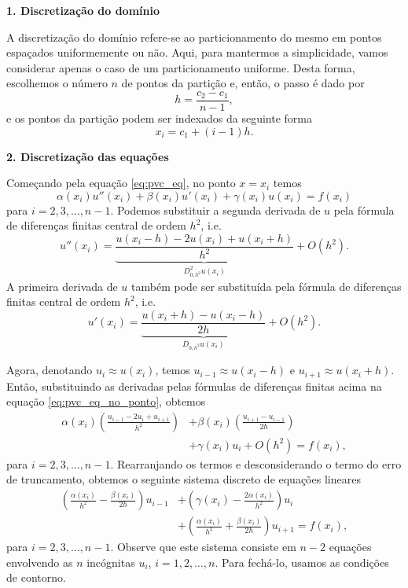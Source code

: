 \begin{flushleft}
  {\bf 1. Discretização do domínio}
\end{flushleft}

A discretização do domínio refere-se ao particionamento do mesmo em pontos espaçados uniformemente ou não. Aqui, para mantermos a simplicidade, vamos considerar apenas o caso de um particionamento uniforme. Desta forma, escolhemos o número $n$ de pontos da partição e, então, o passo é dado por
\begin{equation}
  h = \frac{c_2-c_1}{n-1},
\end{equation}
e os pontos da partição podem ser indexados da seguinte forma
\begin{equation}
  x_i = c_1 + (i-1)h.
\end{equation}

\begin{flushleft}
  {\bf 2. Discretização das equações}
\end{flushleft}

Começando pela equação \eqref{eq:pvc_eq}, no ponto $x=x_i$ temos
\begin{equation}
  \alpha(x_i) u''(x_i) + \beta(x_i) u'(x_i) + \gamma(x_i) u(x_i) = f(x_i) \label{eq:pvc_eq_no_ponto}
\end{equation}
para $i=2, 3, \dotsc, n-1$. Podemos substituir a segunda derivada de $u$ pela fórmula de diferenças finitas central de ordem $h^2$, i.e.
\begin{equation}
  u''(x_i) = \underbrace{\frac{u(x_i-h) - 2u(x_i) + u(x_i+h)}{h^2}}_{D_{0,h^2}^2u(x_i)} + O(h^2).
\end{equation}
A primeira derivada de $u$ também pode ser substituída pela fórmula de diferenças finitas central de ordem $h^2$, i.e.
\begin{equation}
  u'(x_i) = \underbrace{\frac{u(x_i+h)-u(x_i-h)}{2h}}_{D_{0,h^2}u(x_i)} + O(h^2).
\end{equation}

Agora, denotando $u_i \approx u(x_i)$, temos $u_{i-1}\approx u(x_i-h)$ e $u_{i+1}\approx u(x_i+h)$. Então, substituindo as derivadas pelas fórmulas de diferenças finitas acima na equação \eqref{eq:pvc_eq_no_ponto}, obtemos
\begin{align}
  \alpha(x_i)\left(\frac{u_{i-1}-2u_i+u_{i+1}}{h^2}\right) &+ \beta(x_i)\left(\frac{u_{i+1}-u_{i-1}}{2h}\right) \nonumber \\
  &+ \gamma(x_i)u_i + O(h^2) = f(x_i),
\end{align}
para $i=2, 3, \dotsc, n-1$. Rearranjando os termos e desconsiderando o termo do erro de truncamento, obtemos o seguinte sistema discreto de equações lineares
\begin{align}
  \left(\frac{\alpha(x_i)}{h^2}-\frac{\beta(x_i)}{2h}\right)u_{i-1} &+ \left(\gamma(x_i) - \frac{2\alpha(x_i)}{h^2}\right)u_i \nonumber \\
  &+ \left(\frac{\alpha(x_i)}{h^2}+\frac{\beta(x_i)}{2h}\right)u_{i+1} = f(x_i), \label{eq:pvc_mdf_sis1}
\end{align}
para $i=2, 3, \dotsc, n-1$. Observe que este sistema consiste em $n-2$ equações envolvendo as $n$ incógnitas $u_i$, $i=1, 2, \dotsc, n$. Para fechá-lo, usamos as condições de contorno.

